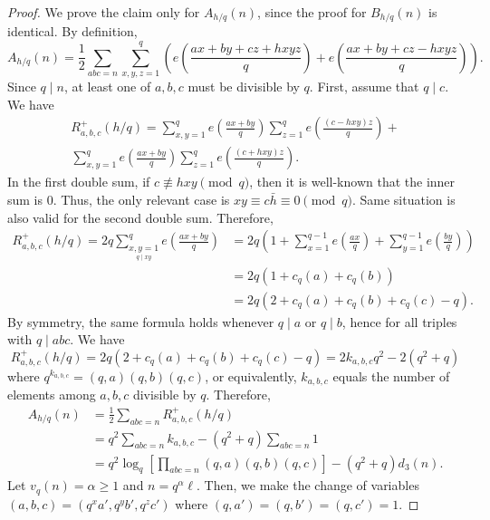 \documentclass[oneside,reqno,10pt]{amsart}
\numberwithin{equation}{section}
\theoremstyle{plain}
\theoremstyle{definition}
\numberwithin{equation}{section}
\begin{document}
\begin{proof}
We prove the claim only for $A_{h/q}(n)$, since the proof for $ B_{h/q}(n)$ is identical. By definition, 
    \begin{equation*}
        A_{h/q}(n)=\frac{1}{2}\sum_{abc=n}\sum_{x,y,z=1}^{q}\left(e\left(\frac{ax+by+cz+hxyz}{q}\right)+e\left(\frac{ax+by+cz-hxyz}{q}\right)\right).
\end{equation*}
    Since $q\mid n$, at least one of $a,b,c$ must be divisible by $q$. First, assume that $q\mid c$. We have
\begin{multline*}
    R^+_{a,b,c}(h/q)=\sum_{x,y=1}^{q}e\left(\frac{ax+by}{q}\right)\sum_{z=1}^{q}e\left(\frac{(c-hxy)z}{q}\right)+\\
    \sum_{x,y=1}^{q}e\left(\frac{ax+by}{q}\right)\sum_{z=1}^{q}e\left(\frac{(c+hxy)z}{q}\right).
\end{multline*}
In the first double sum, if $c\not\equiv hxy\pmod{q}$, then it is well-known that the inner sum is $0$. Thus, the only relevant case is $xy\equiv c\bar h\equiv 0\pmod{q}$. Same situation is also valid for the second double sum. Therefore, 
\begin{align*}
        R^+_{a,b,c}(h/q)=2q\sum_{\underset{q\mid xy}{x,y=1}}^{q}e\left(\frac{ax+by}{q}\right)&=2q\left(1+\sum_{x=1}^{q-1}e\left(\frac{ax}{q}\right)+\sum_{y=1}^{q-1}e\left(\frac{by}{q}\right)\right)\\
        &=2q(1+c_q(a)+c_q(b))\\
        &=2q(2+c_q(a)+c_q(b)+c_q(c)-q).
\end{align*} 
By symmetry, the same formula holds whenever $q\mid a$ or $q\mid b$, hence for all triples with $q\mid abc$. We have
\begin{equation*}
        R^+_{a,b,c}(h/q)=2q(2+c_q(a)+c_q(b)+c_q(c)-q)=2k_{a,b,c}q^2-2(q^2+q)
\end{equation*} where $q^{k_{a,b,c}}=(q,a)(q,b)(q,c)$, or equivalently, $k_{a,b,c}$ equals the number of elements among $a,b,c$ divisible by $q$. Therefore, 
\begin{align*}
        A_{h/q}(n)&=\frac{1}{2}\sum_{abc=n}R^+_{a,b,c}(h/q)\\
        &=q^2\sum_{abc=n} k_{a,b,c}-(q^2+q)\sum_{abc=n}1\\
        &=q^2\log_q\left[\prod_{abc=n} (q,a)(q,b)(q,c)\right]-(q^2+q)d_3(n).
\end{align*} Let $v_q(n)=\alpha\geq 1$ and $n=q^\alpha \ell$. Then, we make the change of variables $(a,b,c)=(q^xa',q^yb',q^zc')$ where $(q,a')=(q,b')=(q,c')=1$.

\end{proof}
\end{document}
